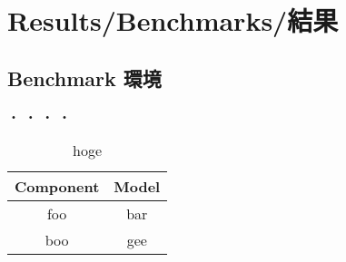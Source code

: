 \chapter{Results/Benchmarks/結果}
\label{chap_Results}

\section{Benchmark 環境}

・
・
・
・


\begin{table}[hbtp]
  \begin{center}
    \caption{hoge}
    \begin{tabular}{cc} \hline
      Component & Model \rule[0pt]{0pt}{0pt} \\ \hline
      foo & bar \rule[0pt]{0pt}{0pt} \\ 
      boo & gee \rule[0pt]{0pt}{0pt} \\\hline
    \end{tabular}
  \end{center}
  \label{tb:arrst}
\end{table}



